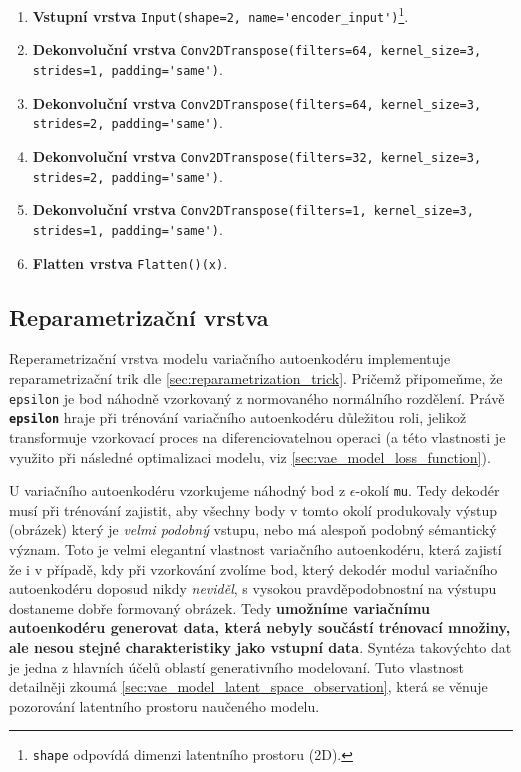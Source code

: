 \begin{enumerate}
    \item \textbf{Vstupní vrstva} \lstinline{Input(shape=2, name='encoder_input')}\footnote{\lstinline{shape} odpovídá dimenzi latentního prostoru (2D).}.
    \item \textbf{Dekonvoluční vrstva} \lstinline{Conv2DTranspose(filters=64, kernel_size=3, strides=1, padding='same')}.
    \item \textbf{Dekonvoluční vrstva} \lstinline{Conv2DTranspose(filters=64, kernel_size=3, strides=2, padding='same')}.
    \item \textbf{Dekonvoluční vrstva} \lstinline{Conv2DTranspose(filters=32, kernel_size=3, strides=2, padding='same')}.
    \item \textbf{Dekonvoluční vrstva} \lstinline{Conv2DTranspose(filters=1, kernel_size=3, strides=1, padding='same')}.
    \item \textbf{Flatten vrstva} \lstinline{Flatten()(x)}.
\end{enumerate}

\subsection{Reparametrizační vrstva}
\label{sec:vae_model_reparametrization_layer}
Reperametrizační vrstva modelu variačního autoenkodéru implementuje reparametrizační trik dle \autoref{sec:reparametrization_trick}.
Pričemž připomeňme, že \lstinline{epsilon} je bod náhodně vzorkovaný z normovaného normálního rozdělení.
Právě \textbf{\lstinline{epsilon}} hraje při trénování variačního autoenkodéru důležitou roli, jelikož transformuje vzorkovací proces na diferenciovatelnou operaci (a této vlastnosti je využito při následné optimalizaci modelu, viz \autoref{sec:vae_model_loss_function}).

U variačního autoenkodéru vzorkujeme náhodný bod z $\epsilon$-okolí \lstinline{mu}.
Tedy dekodér musí při trénování zajistit, aby všechny body v tomto okolí produkovaly výstup (obrázek) který je \emph{velmi podobný} vstupu, nebo má alespoň podobný sémantický význam.
Toto je velmi elegantní vlastnost variačního autoenkodéru, která zajistí že i v případě, kdy při vzorkování zvolíme bod, který dekodér modul variačního autoenkodéru doposud nikdy \emph{neviděl}, s vysokou pravděpodobnostní na výstupu dostaneme dobře formovaný obrázek.
Tedy \textbf{umožníme variačnímu autoenkodéru generovat data, která nebyly součástí trénovací množiny, ale nesou stejné charakteristiky jako vstupní data}. Syntéza takovýchto dat je jedna z hlavních účelů oblastí generativního modelovaní. Tuto vlastnost detailněji zkoumá \autoref{sec:vae_model_latent_space_observation}, která se věnuje pozorování latentního prostoru naučeného modelu.


